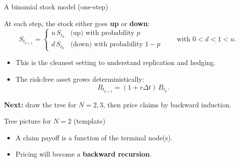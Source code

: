 \documentclass[10pt,aspectratio=169]{beamer}
\begin{document}
\begin{frame}{A binomial stock model (one-step)}

At each step, the stock either goes \textbf{up} or \textbf{down}:
\[
S_{t_{k+1}} =
\begin{cases}
u\,S_{t_k} & \text{(up) with probability $p$}\\
d\,S_{t_k} & \text{(down) with probability $1-p$}
\end{cases}
\qquad \text{with } 0<d<1<u.
\]
\pause

\begin{itemize}
  \item This is the cleanest setting to understand replication and hedging. \pause
  \item The risk-free asset grows deterministically:
  \[
  B_{t_{k+1}}=(1+r\Delta t)\,B_{t_k}.
  \]
  \pause
\end{itemize}

\medskip
\textbf{Next:}\pause\;
draw the tree for \(N=2,3\), then price claims by backward induction.

\end{frame}

\begin{frame}{Tree picture for \(N=2\) (template)}

\centering
{}

\medskip
\begin{itemize}
  \item A claim payoff is a function of the terminal node(s). \pause
  \item Pricing will become a \textbf{backward recursion}. 
\end{itemize}

\end{frame}
\end{document}
